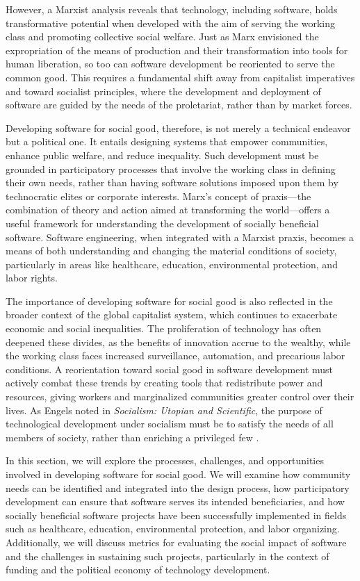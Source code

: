 \begin{refsection}
However, a Marxist analysis reveals that technology, including software, holds transformative potential when developed with the aim of serving the working class and promoting collective social welfare. Just as Marx envisioned the expropriation of the means of production and their transformation into tools for human liberation, so too can software development be reoriented to serve the common good. This requires a fundamental shift away from capitalist imperatives and toward socialist principles, where the development and deployment of software are guided by the needs of the proletariat, rather than by market forces.

Developing software for social good, therefore, is not merely a technical endeavor but a political one. It entails designing systems that empower communities, enhance public welfare, and reduce inequality. Such development must be grounded in participatory processes that involve the working class in defining their own needs, rather than having software solutions imposed upon them by technocratic elites or corporate interests. Marx's concept of praxis—the combination of theory and action aimed at transforming the world—offers a useful framework for understanding the development of socially beneficial software. Software engineering, when integrated with a Marxist praxis, becomes a means of both understanding and changing the material conditions of society, particularly in areas like healthcare, education, environmental protection, and labor rights.

The importance of developing software for social good is also reflected in the broader context of the global capitalist system, which continues to exacerbate economic and social inequalities. The proliferation of technology has often deepened these divides, as the benefits of innovation accrue to the wealthy, while the working class faces increased surveillance, automation, and precarious labor conditions. A reorientation toward social good in software development must actively combat these trends by creating tools that redistribute power and resources, giving workers and marginalized communities greater control over their lives. As Engels noted in \textit{Socialism: Utopian and Scientific}, the purpose of technological development under socialism must be to satisfy the needs of all members of society, rather than enriching a privileged few \cite[pp.~223-225]{engels1880}.

In this section, we will explore the processes, challenges, and opportunities involved in developing software for social good. We will examine how community needs can be identified and integrated into the design process, how participatory development can ensure that software serves its intended beneficiaries, and how socially beneficial software projects have been successfully implemented in fields such as healthcare, education, environmental protection, and labor organizing. Additionally, we will discuss metrics for evaluating the social impact of software and the challenges in sustaining such projects, particularly in the context of funding and the political economy of technology development.


\end{refsection}
